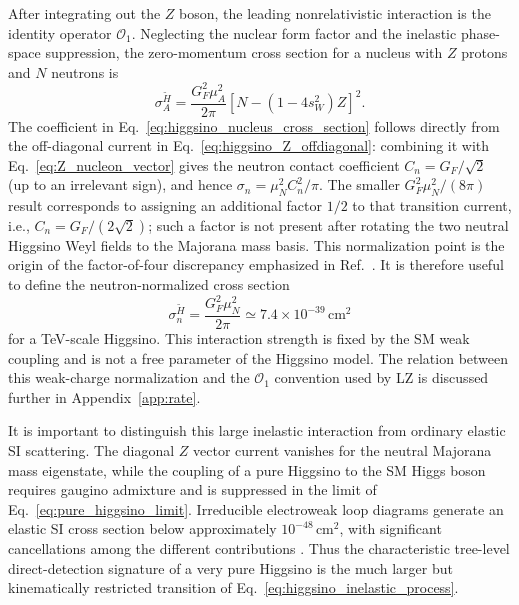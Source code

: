 \documentclass[aps,prd,reprint,superscriptaddress,nofootinbib,longbibliography,floatfix]{revtex4-2}
\begin{document}
After integrating out the $Z$ boson, the leading nonrelativistic interaction is the identity operator $\mathcal{O}_1$. Neglecting the nuclear form factor and the inelastic phase-space suppression, the zero-momentum cross section for a nucleus with $Z$ protons and $N$ neutrons is
\begin{equation}
\sigma_A^{\widetilde H}
=
\frac{G_F^2\mu_A^2}{2\pi}
\left[
N-
\left(
1-4s_W^2
\right)Z
\right]^2.
\label{eq:higgsino_nucleus_cross_section}
\end{equation}
The coefficient in Eq.~\eqref{eq:higgsino_nucleus_cross_section} follows directly from the off-diagonal current in Eq.~\eqref{eq:higgsino_Z_offdiagonal}: combining it with Eq.~\eqref{eq:Z_nucleon_vector} gives the neutron contact coefficient $C_n=G_F/\sqrt{2}$ (up to an irrelevant sign), and hence $\sigma_n=\mu_N^2C_n^2/\pi$. The smaller $G_F^2\mu_N^2/(8\pi)$ result corresponds to assigning an additional factor $1/2$ to that transition current, i.e., $C_n=G_F/(2\sqrt{2})$; such a factor is not present after rotating the two neutral Higgsino Weyl fields to the Majorana mass basis. This normalization point is the origin of the factor-of-four discrepancy emphasized in Ref.~\cite{PospelovRamani2026}.
It is therefore useful to define the neutron-normalized cross section
\begin{equation}
\sigma_n^{\widetilde H}
=
\frac{G_F^2\mu_N^2}{2\pi}
\simeq
7.4\times10^{-39}\,\mathrm{cm}^2
\label{eq:higgsinosigma_theory}
\end{equation}
for a TeV-scale Higgsino. This interaction strength is fixed by the SM weak coupling and is not a free parameter of the Higgsino model. The relation between this weak-charge normalization and the $\mathcal{O}_1$ convention used by LZ is discussed further in Appendix~\ref{app:rate}.

It is important to distinguish this large inelastic interaction from ordinary elastic SI scattering. The diagonal $Z$ vector current vanishes for the neutral Majorana mass eigenstate, while the coupling of a pure Higgsino to the SM Higgs boson requires gaugino admixture and is suppressed in the limit of Eq.~\eqref{eq:pure_higgsino_limit}. Irreducible electroweak loop diagrams generate an elastic SI cross section below approximately $10^{-48}\,\mathrm{cm}^2$, with significant cancellations among the different contributions \cite{NagataShirai2015,KrallReece2018}. Thus the characteristic tree-level direct-detection signature of a very pure Higgsino is the much larger but kinematically restricted transition of Eq.~\eqref{eq:higgsino_inelastic_process}.
\end{document}
